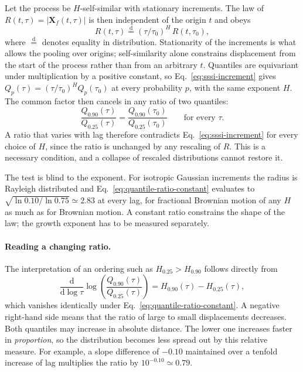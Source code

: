 Let the process be $H$-self-similar with stationary increments. The law of
$R(t,\tau)=|\mathbf X_f(t,\tau)|$ is then independent of the origin $t$ and obeys
\begin{equation}
 R(t,\tau)\overset{\mathrm d}{=}(\tau/\tau_0)^{H}\,R(t,\tau_0),
 \label{eq:sssi-increment}
\end{equation}
where $\overset{\mathrm d}{=}$ denotes equality in distribution. Stationarity of the
increments is what allows the pooling over origins; self-similarity alone constrains
displacement from the start of the process rather than from an arbitrary $t$.
Quantiles are equivariant under multiplication by a positive constant, so
Eq.~\eqref{eq:sssi-increment} gives $Q_p(\tau)=(\tau/\tau_0)^{H}Q_p(\tau_0)$ at every
probability $p$, with the same exponent $H$. The common factor then cancels in any
ratio of two quantiles:
\begin{equation}
 \frac{Q_{0.90}(\tau)}{Q_{0.25}(\tau)}
  =\frac{Q_{0.90}(\tau_0)}{Q_{0.25}(\tau_0)}
 \qquad\text{for every }\tau.
 \label{eq:quantile-ratio-constant}
\end{equation}
A ratio that varies with lag therefore contradicts Eq.~\eqref{eq:sssi-increment} for
every choice of $H$, since the ratio is unchanged by any rescaling of $R$. This is a
necessary condition, and a collapse of rescaled distributions cannot restore it.

The test is blind to the exponent. For isotropic Gaussian increments the radius is
Rayleigh distributed and Eq.~\eqref{eq:quantile-ratio-constant} evaluates to
$\sqrt{\ln 0.10/\ln 0.75}\simeq2.83$ at every lag, for fractional Brownian motion of
any $H$ as much as for Brownian motion. A constant ratio constrains the shape of the
law; the growth exponent has to be measured separately.

\paragraph{Reading a changing ratio.}
The interpretation of an ordering such as $H_{0.25}>H_{0.90}$ follows directly from
\begin{equation}
  \frac{\mathrm d}{\mathrm d\log\tau}
       \log\!\left(\frac{Q_{0.90}(\tau)}{Q_{0.25}(\tau)}\right)
       =H_{0.90}(\tau)-H_{0.25}(\tau),
  \label{eq:quantile-ratio-growth}
\end{equation}
which vanishes identically under Eq.~\eqref{eq:quantile-ratio-constant}.
A negative right-hand side means that the ratio of large to small displacements decreases.
Both quantiles may increase in absolute distance. The lower one increases faster in
\emph{proportion}, so the distribution becomes less spread out by this relative measure.
For example, a slope difference of $-0.10$ maintained over a tenfold increase of lag
multiplies the ratio by $10^{-0.10}\simeq0.79$.

